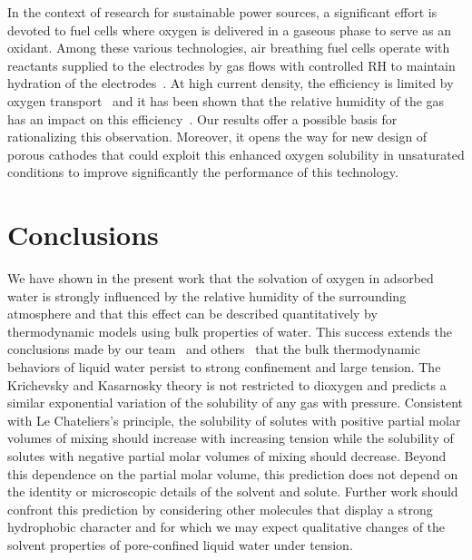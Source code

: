 \documentclass[aps,prl,twocolumn,superscriptaddress,groupedaddress]{revtex4}
\begin{document}

In the context of research for sustainable power sources, a significant effort is devoted to fuel cells where oxygen is delivered in a gaseous phase to serve as an oxidant. Among these various technologies, air breathing fuel cells operate with reactants supplied to the electrodes by gas flows with controlled $\mathrm{RH}$ to maintain hydration of the electrodes~\cite{ferrigno_2002,coz_2016}. At high current density, the efficiency is limited by oxygen transport~\cite{kjeang_2009,jayashree_2005,owejan_2014,weber_2014} and it has been shown that the relative humidity of the gas has an impact on this efficiency~\cite{chu_1999,jayashree_2005,simon_2017}. Our results offer a possible basis for rationalizing this observation. Moreover, it opens the way for new design of porous cathodes that could exploit this enhanced oxygen solubility in unsaturated conditions to improve significantly the performance of this technology.

\section{Conclusions}

We have shown in the present work that the solvation of oxygen in adsorbed water is strongly influenced by the relative humidity of the surrounding atmosphere and that this effect can be described quantitatively by thermodynamic models using bulk properties of water. This success extends the conclusions made by our team~\cite{vincent_2014,vincent_2016,vincent_2017a} and others~\cite{gruener_2009,huber_2015} that the  bulk thermodynamic behaviors of liquid water persist to strong confinement and large tension. The Krichevsky and Kasarnosky theory is not restricted to dioxygen and predicts a similar exponential variation of the solubility of any gas with pressure. Consistent with Le Chateliers's principle, the solubility of solutes with positive partial molar volumes of mixing should increase with increasing tension while the solubility of solutes with negative partial molar volumes of mixing should decrease. Beyond this dependence on the partial molar volume, this prediction does not depend on the identity or microscopic details of the solvent and solute. Further work should confront this prediction by considering other molecules that display a strong hydrophobic character and for which we may expect qualitative changes of the solvent properties of pore-confined liquid water under tension.
\end{document}
